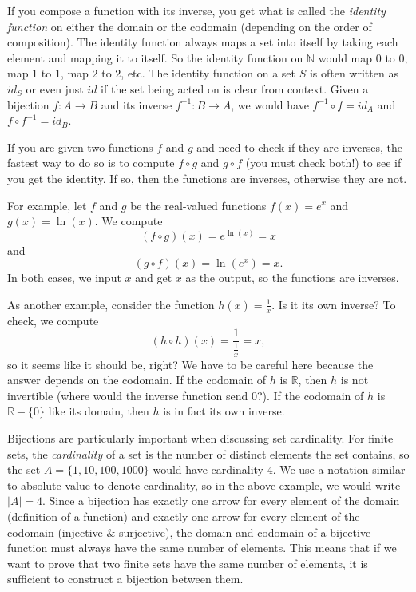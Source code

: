 \documentclass[11pt,oneside]{book}
\theoremstyle{definition}
\begin{document}
If you compose a function with its inverse, you get what is called the \emph{identity function} on either the domain or the codomain (depending on the order of composition).
The identity function always maps a set into itself by taking each element and mapping it to itself.
So the identity function on $\mathbb{N}$ would map $0$ to $0$, map $1$ to $1$, map $2$ to $2$, etc.
The identity function on a set $S$ is often written as $id_{S}$ or even just $id$ if the set being acted on is clear from context.
Given a bijection $f: A \to B$ and its inverse $f^{-1}: B \to A$, we would have $f^{-1} \circ f = id_{A}$ and $f \circ f^{-1} = id_{B}$.

If you are given two functions $f$ and $g$ and need to check if they are inverses, the fastest way to do so is to compute $f \circ g$ and $g \circ f$ (you must check both!) to see if you get the identity.
If so, then the functions are inverses, otherwise they are not.

For example, let $f$ and $g$ be the real-valued functions $f(x) = e^{x}$ and $g(x) = \ln(x)$.
We compute
\[ (f \circ g)(x) = e^{\ln(x)} = x \]
and
\[ (g \circ f)(x) = \ln(e^{x}) = x. \]
In both cases, we input $x$ and get $x$ as the output, so the functions are inverses.

As another example, consider the function $h(x) = \frac{1}{x}$.
Is it its own inverse?
To check, we compute
\[ (h \circ h)(x) = \frac{1}{\frac{1}{x}} = x, \]
so it seems like it should be, right?
We have to be careful here because the answer depends on the codomain.
If the codomain of $h$ is $\mathbb{R}$, then $h$ is not invertible (where would the inverse function send 0?).
If the codomain of $h$ is $\mathbb{R} - \{ 0 \}$ like its domain, then $h$ is in fact its own inverse.

Bijections are particularly important when discussing set cardinality.
For finite sets, the \emph{cardinality} of a set is the number of distinct elements the set contains, so the set $A = \{ 1, 10, 100, 1000 \}$ would have cardinality 4.
We use a notation similar to absolute value to denote cardinality, so in the above example, we would write $|A| = 4$.
Since a bijection has exactly one arrow for every element of the domain (definition of a function) and exactly one arrow for every element of the codomain (injective \& surjective), the domain and codomain of a bijective function must always have the same number of elements.
This means that if we want to prove that two finite sets have the same number of elements, it is sufficient to construct a bijection between them.
\end{document}
